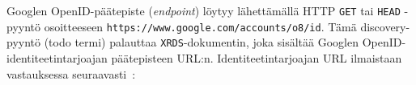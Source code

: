 \documentclass[finnish,gradu]{tktltiki}
\begin{document}

  Googlen OpenID-päätepiste (\emph{endpoint}) löytyy lähettämällä HTTP \verb#GET# tai \verb#HEAD# -pyyntö osoitteeseen \verb#https://www.google.com/accounts/o8/id#. Tämä discovery-pyyntö (todo termi) palauttaa \verb#XRDS#-dokumentin, joka sisältää Googlen OpenID-identiteetintarjoajan päätepisteen URL:n. Identiteetintarjoajan URL ilmaistaan vastauksessa seuraavasti~\cite{google_openid_dev_docs}:
\end{document}
